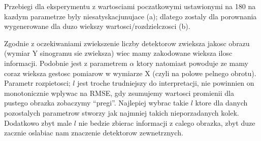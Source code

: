 \documentclass{bmvc2k}
\begin{document}
Przebiegi dla eksperymentu z wartosciami poczatkowymi ustawionymi na 180 na
kazdym parametrze byly niesatyskacjunujace (a); dlatego zostaly dla porownania
wygenerowane dla duzo wiekszy wartosci/rozdzielczosci (b).

Zgodnie z oczekiwaniami zwiekszenie liczby detektorow zwieksza jakosc obrazu
(wymiar Y sinogramu sie zwieksza) wiec mamy zakodowane wieksza ilosc informacji.
Podobnie jest z parametrem $\alpha$ ktory natomiast powoduje ze mamy coraz
wieksza gestosc pomiarow w wymiarze X (czyli na polowe pelnego obrotu).
Parametr rozpietosci; $l$ jest troche trudniejszy do interpretacji, nie
powinnien on monotonicznie wplywac na RMSE, gdy zsumujemy wartosci promienii dla
pustego obrazka zobaczymy ``pregi''. Najlepiej wybrac takie $l$ ktore dla danych
pozostalych parametrow stworzy jak najmniej takich nieporzadanych kolek.
Dodatkowo zbyt male $l$ nie bedzie zbierac informacji z calego obrazka, zbyt
duze zacznie oslabiac nam znaczenie detektorow zewnetrznych.
\end{document}
